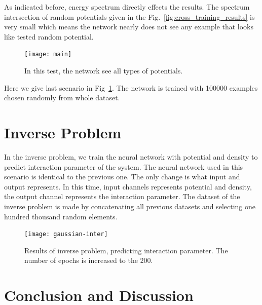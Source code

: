 \documentclass[a4paper,times,hidelinks,12pt]{article}
\begin{document}
As indicated before, energy spectrum directly effects the results. The spectrum intersection of random potentials given in the Fig.~\ref{fig:cross_training_results} is very small which means the network nearly does not see any example that looks like tested random potential.


\graphicspath{{"../figs/training/combined/"}}
\begin{figure}[H]
    \centering
    \texttt{[image: main]}
\caption{In this test, the network see all types of potentials.}
\label{fig:comb_training_results}
\end{figure}

Here we give last scenario in Fig~\ref{fig:comb_training_results}. The network is trained with 100000 examples chosen randomly from whole dataset.  



\section{Inverse Problem}

In the inverse problem, we train the neural network with potential and density to predict interaction parameter of the system. The neural network used in this scenario is identical to the previous one. The only change is what input and output represents. In this time, input channels represents potential and density, the output channel represents the interaction parameter. The dataset of the inverse problem is made by concatenating all previous datasets and selecting one hundred thousand random elements. 

\graphicspath{{"../figs/training/interaction/"}}
\begin{figure}[H]
    \centering
    \texttt{[image: gaussian-inter]}
\caption{Results of inverse problem, predicting interaction parameter. The number of epochs is increased to the 200. }
\label{fig:inverse_results}
\end{figure}

\clearpage
\section{Conclusion and Discussion}
\end{document}
